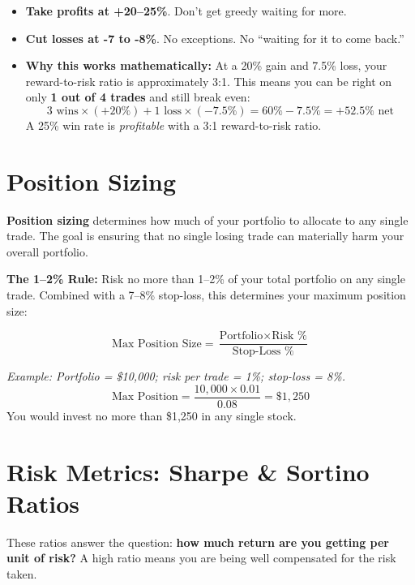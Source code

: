 \documentclass[11pt, letterpaper]{article}
\begin{document}
\begin{tcolorbox}[colback=part6bg, colframe=sectionred,
  title={\bfseries The 3:1 Reward-to-Risk Rule}, arc=3pt, boxrule=1pt]
\begin{itemize}[noitemsep, leftmargin=*]
  \item \textbf{Take profits at +20--25\%}. Don't get greedy waiting for more.
  \item \textbf{Cut losses at -7 to -8\%}. No exceptions. No ``waiting for it to come back.''
  \item \textbf{Why this works mathematically:} At a 20\% gain and 7.5\% loss, your reward-to-risk ratio is approximately 3:1. This means you can be right on only \textbf{1 out of 4 trades} and still break even:
  \[
    3 \text{ wins} \times (+20\%) + 1 \text{ loss} \times (-7.5\%) = 60\% - 7.5\% = +52.5\% \text{ net}
  \]
  A 25\% win rate is \emph{profitable} with a 3:1 reward-to-risk ratio.
\end{itemize}
\end{tcolorbox}

\section*{Position Sizing}

\textbf{Position sizing} determines how much of your portfolio to allocate to any single trade. The goal is ensuring that no single losing trade can materially harm your overall portfolio.

\textbf{The 1--2\% Rule:} Risk no more than 1--2\% of your total portfolio on any single trade. Combined with a 7--8\% stop-loss, this determines your maximum position size:

\[
  \text{Max Position Size} = \frac{\text{Portfolio} \times \text{Risk \%}}{\text{Stop-Loss \%}}
\]

\textit{Example: Portfolio = \$10{,}000; risk per trade = 1\%; stop-loss = 8\%.}
\[
  \text{Max Position} = \frac{10{,}000 \times 0.01}{0.08} = \$1{,}250
\]
You would invest no more than \$1{,}250 in any single stock.

\section*{Risk Metrics: Sharpe \& Sortino Ratios}

These ratios answer the question: \textbf{how much return are you getting per unit of risk?} A high ratio means you are being well compensated for the risk taken.
\end{document}
